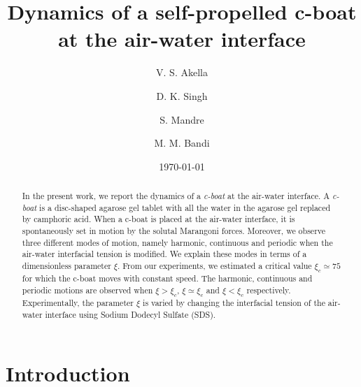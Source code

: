 \documentclass[aps, twocolumn, floatfix, superscriptaddress]{revtex4}
\begin{document}
\title{Dynamics of a self-propelled c-boat at the air-water interface}

\author{V. S. Akella}
\author{D. K. Singh}
\author{S. Mandre}
\author{M. M. Bandi}

\date{\today}

\begin{abstract}
In the present work, we report the dynamics of a \emph{c-boat} at the air-water interface. A \emph{c-boat} is a disc-shaped agarose gel tablet with all the water in the agarose gel replaced by camphoric acid. When a c-boat is placed at the air-water interface, it is spontaneously set in motion by the solutal Marangoni forces. Moreover, we observe three different modes of motion, namely harmonic, continuous and periodic when the air-water interfacial tension is modified. We explain these modes in terms of a dimensionless parameter $\xi$. From our experiments, we estimated a critical value $\xi_{c} \simeq 75$ for which the c-boat moves with constant speed. The harmonic, continuous and periodic motions are observed when $\xi > \xi_{c}$,  $\xi \simeq \xi_{c}$ and $\xi < \xi_{c}$ respectively. Experimentally, the parameter $\xi$ is varied by changing the interfacial tension of the air-water interface using Sodium Dodecyl Sulfate (SDS).
\end{abstract}

\maketitle
\section{Introduction}
\end{document}
